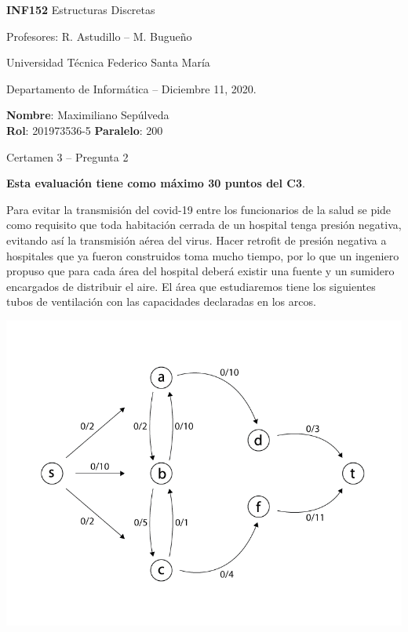 \documentclass[10pt]{article}
\begin{document}
\thispagestyle{empty}

\begin{minipage}[t]{0.6\textwidth}

{\LARGE \textbf{INF152} Estructuras Discretas}

{\large Profesores: R. Astudillo -- M. Bugueño}

Universidad Técnica Federico Santa María

Departamento de Informática -- Diciembre 11, 2020.

\end{minipage}
\hfill
\begin{minipage}[t]{0.35\textwidth}
\textbf{Nombre}: Maximiliano Sepúlveda\\[0.3cm]
\textbf{Rol}: 201973536-5 \textbf{Paralelo}: 200
\end{minipage}

\vspace{0.8cm}

{\Large Certamen 3 -- Pregunta 2}

\vspace{0.4cm}

\textbf{Esta evaluación tiene como máximo 30 puntos del C3}.

\noindent Para evitar la transmisión del covid-19 entre los funcionarios de la salud se pide como requisito que toda habitación cerrada de un hospital
tenga presión negativa, evitando así la transmisión aérea del virus. Hacer retrofit de presión negativa a hospitales que ya fueron construidos toma mucho tiempo, por lo que un ingeniero propuso que para cada área del hospital deberá existir una fuente y un sumidero encargados de distribuir el aire. El área que estudiaremos tiene los siguientes tubos de ventilación con las capacidades declaradas en los arcos.
\begin{center}
  \includegraphics[scale=0.5]{BASE.png}
\end{center}
\end{document}
